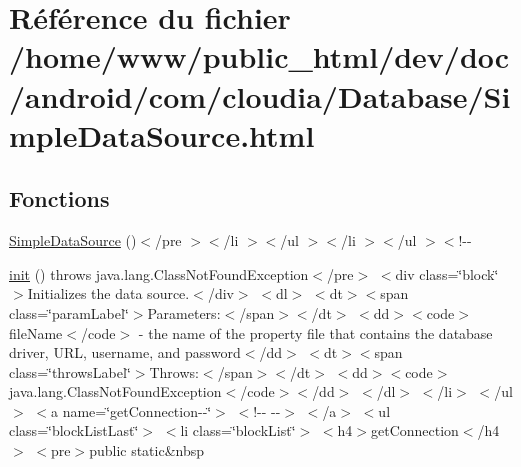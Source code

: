 \hypertarget{_simple_data_source_8html}{\section{Référence du fichier /home/www/public\-\_\-html/dev/doc/android/com/cloudia/\-Database/\-Simple\-Data\-Source.html}
\label{_simple_data_source_8html}
}
\subsection*{Fonctions}
\begin{DoxyCompactItemize}
\item 
\hyperlink{_simple_data_source_8html_a43df9c7bd13ba82f537982349276d51a}{Simple\-Data\-Source} ()$<$/pre $>$$<$/li $>$$<$/ul $>$$<$/li $>$$<$/ul $>$$<$!-\/-\/
\item 
\hyperlink{_simple_data_source_8html_a4be4055f3361d4800e16bc2e2e38cda6}{init} ()  throws java.\-lang.\-Class\-Not\-Found\-Exception$<$/pre$>$ $<$div class=\char`\"{}block\char`\"{}$>$\-Initializes the data source.$<$/div$>$ $<$dl$>$ $<$dt$>$$<$span class=\char`\"{}param\-Label\char`\"{}$>$\-Parameters\-:$<$/span$>$$<$/dt$>$ $<$dd$>$$<$code$>$file\-Name$<$/code$>$ -\/ the name of the property file that        contains the database driver, U\-R\-L, username, and password$<$/dd$>$ $<$dt$>$$<$span class=\char`\"{}throws\-Label\char`\"{}$>$\-Throws\-:$<$/span$>$$<$/dt$>$ $<$dd$>$$<$code$>$java.\-lang.\-Class\-Not\-Found\-Exception$<$/code$>$$<$/dd$>$ $<$/dl$>$ $<$/li$>$ $<$/ul$>$ $<$a name=\char`\"{}get\-Connection-\/-\/\char`\"{}$>$ $<$!-\/-\/   -\/-\/$>$ $<$/a$>$ $<$ul class=\char`\"{}block\-List\-Last\char`\"{}$>$ $<$li class=\char`\"{}block\-List\char`\"{}$>$ $<$h4$>$get\-Connection$<$/h4$>$ $<$pre$>$public static\&nbsp
\item 

\end{DoxyCompactItemize}
